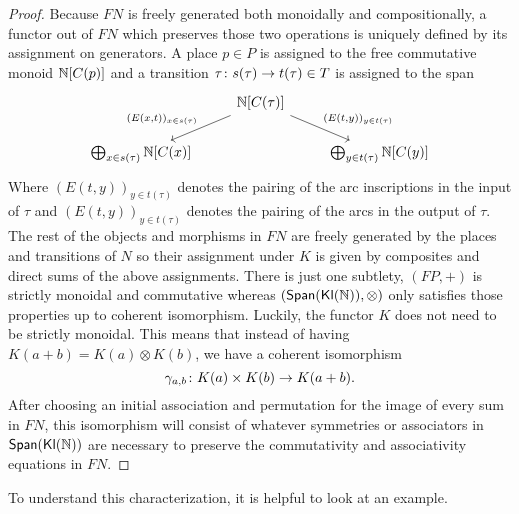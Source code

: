 \begin{proof}
    Because $FN$ is freely generated both monoidally and compositionally, a functor out of $FN$ which preserves those two operations is uniquely defined by its assignment on generators. A place $p \in P$ is assigned to the free commutative monoid $\mathbb{N}[C(p)]$ and a transition $\tau \colon s(\tau) \to t(\tau) \in T$ is assigned to the span 
    \[\begin{tikzcd}
        &
        \N[C(\tau)]
        \ar[dl, "({E(x, t)})_{x \in s(\tau)}", swap] 
        \ar[dr, "({E(t, y)})_{y \in t(\tau)}"] 
        &\\
        \bigoplus_{x \in s(\tau)} \N[C(x)] 
        && 
        \bigoplus_{y \in t(\tau)} \N[C(y)]
    \end{tikzcd}\]
    Where $({E(t, y)})_{y \in t(\tau)}$ denotes the pairing of the arc inscriptions in the input of $\tau$ and $({E(t, y)})_{y \in t(\tau)}$ denotes the pairing of the arcs in the output of $\tau$. The rest of the objects and morphisms in $FN$ are freely generated by the places and transitions of $N$ so their assignment under $K$ is given by composites and direct sums of the above assignments. There is just one subtlety, $(FP, +)$ is strictly monoidal and commutative whereas $(\mathsf{Span}(\mathsf{\mathsf{Kl}(\mathbb{N}) }), \otimes)$ only satisfies those properties up to coherent isomorphism. Luckily, the functor $K$ does not need to be strictly monoidal. This means that instead of having $K(a+b) = K(a) \otimes K(b)$, we have a coherent isomorphism \[ 
        \gamma_{a, b} \colon K(a) \times K(b) \to K(a+b). 
    \]
    After choosing an initial association and permutation for the image of every sum in $FN$, this isomorphism will consist of whatever symmetries or associators in $\mathsf{Span}(\mathsf{\mathsf{Kl}(\mathbb{N}) })$ are necessary to preserve the commutativity and associativity equations in $FN$.
\end{proof}
To understand this characterization, it is helpful to look at an example.
